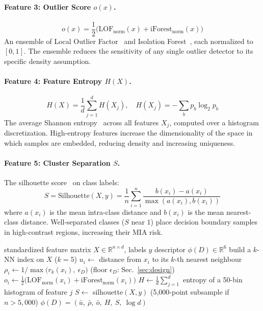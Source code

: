 \paragraph{Feature 3: Outlier Score $o(x)$.}
\begin{equation}
  o(x) = \frac{1}{2}\bigl(\mathrm{LOF}_{\mathrm{norm}}(x)
                         + \mathrm{iForest}_{\mathrm{norm}}(x)\bigr)
\end{equation}
An ensemble of Local Outlier Factor~\cite{breunig2000lof} and Isolation
Forest~\cite{liu2008isolation}, each normalized to $[0,1]$.
The ensemble reduces the sensitivity of any single outlier detector to
its specific density assumption.

\paragraph{Feature 4: Feature Entropy $H(X)$.}
\begin{equation}
  H(X) = \frac{1}{d} \sum_{j=1}^{d} H(X_j), \quad
  H(X_j) = -\sum_b p_b \log_2 p_b
\end{equation}
The average Shannon entropy~\cite{shannon1948mathematical} across all
features $X_j$, computed over a histogram discretization.
High-entropy features increase the dimensionality of the space in which
samples are embedded, reducing density and increasing uniqueness.

\paragraph{Feature 5: Cluster Separation $S$.}
The silhouette score~\cite{rousseeuw1987silhouettes} on class labels:
\begin{equation}
  S = \mathrm{Silhouette}(X, y)
  = \frac{1}{n}\sum_{i=1}^{n} \frac{b(x_i) - a(x_i)}{\max(a(x_i), b(x_i))}
\end{equation}
where $a(x_i)$ is the mean intra-class distance and $b(x_i)$ is the
mean nearest-class distance.
Well-separated classes ($S$ near $1$) place decision boundary samples
in high-contrast regions, increasing their MIA risk.

\begin{algorithm}[t]
\caption{DPRI feature extraction}
\label{alg:dpri}
\begin{algorithmic}[1]
\Require standardized feature matrix $X \in \mathbb{R}^{n \times d}$, labels $y$
\Ensure descriptor $\phi(D) \in \mathbb{R}^{6}$
\State build a $k$-NN index on $X$ \hfill ($k = 5$)
  \State $u_i \gets$ distance from $x_i$ to its $k$-th nearest neighbour
  \State $\rho_i \gets 1 / \max\bigl(r_k(x_i),\ \epsilon_D\bigr)$
         \hfill (floor $\epsilon_D$: Sec.~\ref{sec:design})
  \State $o_i \gets \tfrac{1}{2}\bigl(\mathrm{LOF}_{\mathrm{norm}}(x_i)
         + \mathrm{iForest}_{\mathrm{norm}}(x_i)\bigr)$
\EndFor
\State $H \gets \frac{1}{d}\sum_{j=1}^{d}$ entropy of a 50-bin histogram
       of feature $j$
\State $S \gets$ silhouette$(X, y)$
       \hfill (5{,}000-point subsample if $n > 5{,}000$)
\State \Return $\phi(D) = (\bar{u},\ \bar{\rho},\ \bar{o},\ H,\ S,\ \log d)$
\end{algorithmic}
\end{algorithm}

